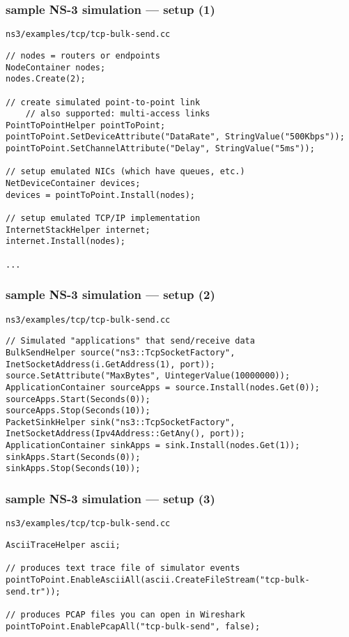 \begin{FragileFrame}
\frametitle{sample NS-3 simulation --- setup (1)}
{\scriptsize \texttt{ns3/examples/tcp/tcp-bulk-send.cc}}
\begin{Verbatim}[fontsize=\fontsize{9}{10}]
// nodes = routers or endpoints
NodeContainer nodes;
nodes.Create(2);

// create simulated point-to-point link
    // also supported: multi-access links
PointToPointHelper pointToPoint;
pointToPoint.SetDeviceAttribute("DataRate", StringValue("500Kbps"));
pointToPoint.SetChannelAttribute("Delay", StringValue("5ms"));

// setup emulated NICs (which have queues, etc.)
NetDeviceContainer devices;
devices = pointToPoint.Install(nodes);

// setup emulated TCP/IP implementation
InternetStackHelper internet;
internet.Install(nodes);

...
\end{Verbatim}
\end{FragileFrame}

\begin{FragileFrame}
\frametitle{sample  NS-3 simulation --- setup (2)}
{\scriptsize \texttt{ns3/examples/tcp/tcp-bulk-send.cc}}
\begin{Verbatim}[fontsize=\fontsize{9}{10}]
// Simulated "applications" that send/receive data
BulkSendHelper source("ns3::TcpSocketFactory", InetSocketAddress(i.GetAddress(1), port));
source.SetAttribute("MaxBytes", UintegerValue(10000000));
ApplicationContainer sourceApps = source.Install(nodes.Get(0));
sourceApps.Start(Seconds(0));
sourceApps.Stop(Seconds(10));
PacketSinkHelper sink("ns3::TcpSocketFactory", InetSocketAddress(Ipv4Address::GetAny(), port));
ApplicationContainer sinkApps = sink.Install(nodes.Get(1));
sinkApps.Start(Seconds(0));
sinkApps.Stop(Seconds(10));
\end{Verbatim}
\end{FragileFrame}

\begin{FragileFrame}
\frametitle{sample NS-3 simulation --- setup (3)}
{\scriptsize \texttt{ns3/examples/tcp/tcp-bulk-send.cc}}
\begin{Verbatim}[fontsize=\fontsize{9}{10}]
AsciiTraceHelper ascii;

// produces text trace file of simulator events
pointToPoint.EnableAsciiAll(ascii.CreateFileStream("tcp-bulk-send.tr"));

// produces PCAP files you can open in Wireshark
pointToPoint.EnablePcapAll("tcp-bulk-send", false);
\end{Verbatim}
\end{FragileFrame}


